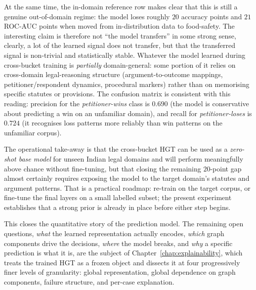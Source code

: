 At the same time, the in-domain reference row makes clear that this
is still a genuine out-of-domain regime: the model loses roughly
$20$ accuracy points and $21$ ROC-AUC points when moved from
in-distribution data to food-safety. The interesting claim is
therefore not ``the model transfers'' in some strong sense,
clearly, a lot of the learned signal does not transfer, but that
the transferred signal is non-trivial and statistically stable.
Whatever the model learned during cross-bucket training is
\emph{partially} domain-general: some portion of it relies on
cross-domain legal-reasoning structure (argument-to-outcome
mappings, petitioner/respondent dynamics, procedural markers)
rather than on memorising specific statutes or provisions. The
confusion matrix is consistent with this reading: precision for the
\emph{petitioner-wins} class is $0.690$ (the model is conservative
about predicting a win on an unfamiliar domain), and recall for
\emph{petitioner-loses} is $0.724$ (it recognises loss patterns
more reliably than win patterns on the unfamiliar corpus).

The operational take-away is that the cross-bucket HGT can be used
as a \emph{zero-shot base model} for unseen Indian legal domains and
will perform meaningfully above chance without fine-tuning, but
that closing the remaining $20$-point gap almost certainly requires
exposing the model to the target domain's statutes and argument
patterns. That is a practical roadmap: re-train on the target
corpus, or fine-tune the final layers on a small labelled subset;
the present experiment establishes that a strong prior is already in
place before either step begins.

\vspace{0.5em}

This closes the quantitative story of the prediction model. The
remaining open questions, \emph{what} the learned representation
actually encodes, \emph{which} graph components drive the decisions,
\emph{where} the model breaks, and \emph{why} a specific prediction
is what it is, are the subject of
Chapter~\ref{chap:explainability}, which treats the trained HGT as a
frozen object and dissects it at four progressively finer levels of
granularity: global representation, global dependence on graph
components, failure structure, and per-case explanation.

\endinput


\section{Probing Classifier Analysis}

